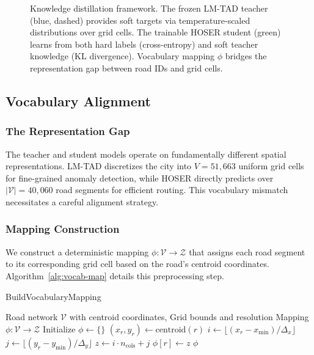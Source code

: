 \begin{figure}[t]
\caption{Knowledge distillation framework. The frozen LM-TAD teacher (blue, dashed) provides soft targets via temperature-scaled distributions over grid cells. The trainable HOSER student (green) learns from both hard labels (cross-entropy) and soft teacher knowledge (KL divergence). Vocabulary mapping $\phi$ bridges the representation gap between road IDs and grid cells.}
\label{fig:distillation-framework}
\end{figure}

\subsection{Vocabulary Alignment}
\label{sec:method-vocab}

\subsubsection{The Representation Gap}
The teacher and student models operate on fundamentally different spatial representations. LM-TAD discretizes the city into $V = 51{,}663$ uniform grid cells for fine-grained anomaly detection, while HOSER directly predicts over $|\mathcal{V}| = 40{,}060$ road segments for efficient routing. This vocabulary mismatch necessitates a careful alignment strategy.

\subsubsection{Mapping Construction}
We construct a deterministic mapping $\phi: \mathcal{V} \rightarrow \mathcal{Z}$ that assigns each road segment to its corresponding grid cell based on the road's centroid coordinates. Algorithm~\ref{alg:vocab-map} details this preprocessing step.

\begin{algorithm}[t]
\caption{BuildVocabularyMapping}
\label{alg:vocab-map}
\begin{algorithmic}
\Require Road network $\mathcal{V}$ with centroid coordinates, Grid bounds and resolution
\Ensure Mapping $\phi: \mathcal{V} \rightarrow \mathcal{Z}$
\State Initialize $\phi \gets \{\}$
    \State $(x_r, y_r) \gets \text{centroid}(r)$
    \State $i \gets \lfloor (x_r - x_{\min}) / \Delta_x \rfloor$ 
    \State $j \gets \lfloor (y_r - y_{\min}) / \Delta_y \rfloor$ 
    \State $z \gets i \cdot n_{\text{cols}} + j$ 
    \State $\phi[r] \gets z$
\EndFor
\State \Return $\phi$
\end{algorithmic}
\end{algorithm}

